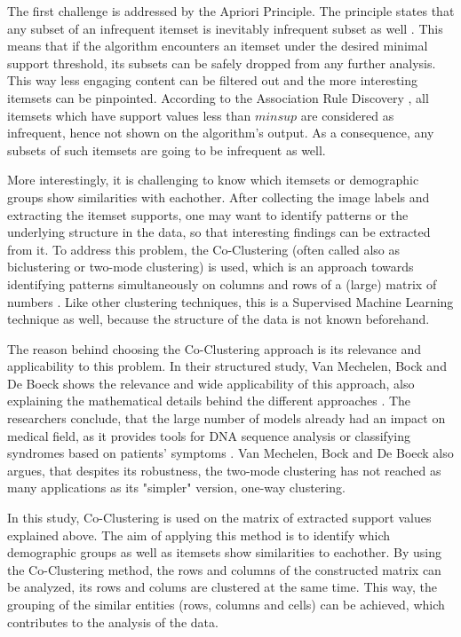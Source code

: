 The first challenge is addressed by the Apriori Principle. The principle states that any subset of an infrequent itemset is inevitably infrequent subset as well \cite{introtodatamining}. This means that if the algorithm encounters an itemset under the desired minimal support threshold, its subsets can be safely dropped from any further analysis. This way less engaging content can be filtered out and the more interesting itemsets can be pinpointed. According to the Association Rule Discovery \cite{introtodatamining}, all itemsets which have support values less than $minsup$ are considered as infrequent, hence not shown on the algorithm's output. As a consequence, any subsets of such itemsets are going to be infrequent as well. 

More interestingly, it is challenging to know which itemsets or demographic groups show similarities with eachother. After collecting the image labels and extracting the itemset supports, one may want to identify patterns or the underlying structure in the data, so that interesting findings can be extracted from it. To address this problem, the Co-Clustering (often called also as biclustering or two-mode clustering) is used, which is an approach towards identifying patterns simultaneously on columns and rows of a (large) matrix of numbers \cite{coclustering}. Like other clustering techniques, this is a Supervised Machine Learning technique as well, because the structure of the data is not known beforehand. 

The reason behind choosing the Co-Clustering approach is its relevance and applicability to this problem. In their structured study, Van Mechelen, Bock and De Boeck shows the relevance and wide applicability of this approach, also explaining the mathematical details behind the different approaches \cite{coclustering}. The researchers conclude, that the large number of models already had an impact on medical field, as it provides tools for DNA sequence analysis or classifying syndromes based on patients' symptoms \cite{coclustering}. Van Mechelen, Bock and De Boeck also argues, that despites its robustness, the two-mode clustering has not reached as many applications as its "simpler" version, one-way clustering. 

In this study, Co-Clustering is used on the matrix of extracted support values explained above. The aim of applying this method is to identify which demographic groups as well as itemsets show similarities to eachother. By using the Co-Clustering method, the rows and columns of the constructed matrix can be analyzed, its rows and colums are clustered at the same time. This way, the grouping of the similar entities (rows, columns and cells) can be achieved, which contributes to the analysis of the data.


